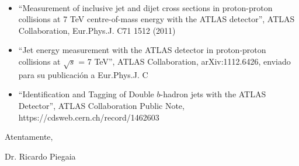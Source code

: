 \begin{letter}{\ }
\begin{itemize}
\item ``Measurement of inclusive jet and dijet cross sections in proton-proton collisions at 7 TeV centre-of-mass energy with the {ATLAS} detector'', ATLAS Collaboration, Eur.Phys.J. C71 1512 (2011)

\item ``Jet energy measurement with the ATLAS detector in proton-proton collisions at $\sqrt{s}$ = 7 TeV'', ATLAS Collaboration, arXiv:1112.6426, enviado para su publicaci\'on a Eur.Phys.J. C

\item ``Identification and Tagging of Double $b$-hadron jets with the ATLAS Detector'', ATLAS Collaboration Public Note, https://cdsweb.cern.ch/record/1462603

\end{itemize}

Atentamente,

\vspace{5mm}

\begin{flushleft}
Dr. Ricardo Piegaia 
\end{flushleft}

\end{letter}

